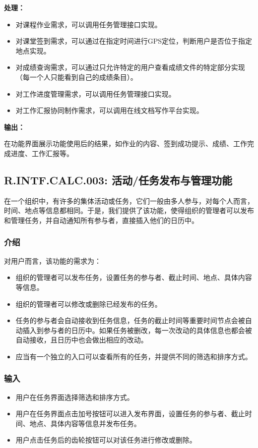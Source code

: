 \textbf{处理：}

\begin{itemize}
    \item 对课程作业需求，可以调用任务管理接口实现。
    \item 对课堂签到需求，可以通过在指定时间进行GPS定位，判断用户是否位于指定地点实现。
    \item 对成绩查询需求，可以通过只允许特定的用户查看成绩文件的特定部分实现（每一个人只能看到自己的成绩条目）。
    \item 对工作进度管理需求，可以调用任务管理接口实现。
    \item 对工作汇报协同制作需求，可以调用在线文档写作平台实现。
\end{itemize}

\textbf{输出：}

在功能界面展示功能使用后的结果，如作业的内容、签到成功提示、成绩、工作完成进度、工作汇报等。

\subsection{R.INTF.CALC.003: 活动/任务发布与管理功能}
在一个组织中，有许多的集体活动或任务，它们一般由多人参与，对每个人而言，时间、地点等信息都相同。于是，我们提供了该功能，使得组织的管理者可以发布和管理任务，并自动通知所有参与者，直接插入他们的日历中。
\subsubsection{介绍}
对用户而言，该功能的需求为：
\begin{itemize}
  \item 组织的管理者可以发布任务，设置任务的参与者、截止时间、地点、具体内容等信息。
  \item 组织的管理者可以修改或删除已经发布的任务。
  \item 任务的参与者会自动接收到任务信息，任务的截止时间等重要时间节点会被自动插入到参与者的日历中。如果任务被删改，每一次改动的具体信息也都会被自动接收，且日历中也会做出相应的改动。
  \item 应当有一个独立的入口可以查看所有的任务，并提供不同的筛选和排序方式。
\end{itemize}
\subsubsection{输入}
\begin{itemize}
  \item 用户在任务界面选择筛选和排序方式。
  \item 用户在任务界面点击加号按钮可以进入发布界面，设置任务的参与者、截止时间、地点、具体内容等信息并发布任务。
  \item 用户点击任务后的齿轮按钮可以对该任务进行修改或删除。
\end{itemize}
